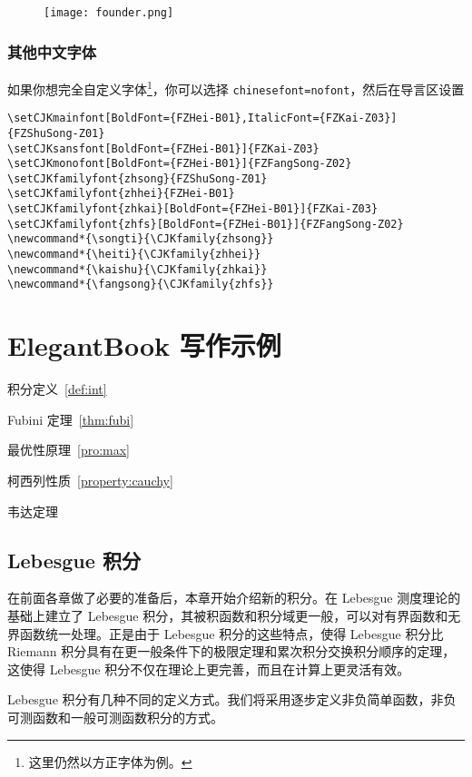 \documentclass[lang=cn,newtx,10pt,scheme=chinese,color=black]{elegantbook}
\begin{document}
\begin{figure}[!htb]
\centering
\texttt{[image: founder.png]}
\end{figure}

\subsection{其他中文字体}
如果你想完全自定义字体\footnote{这里仍然以方正字体为例。}，你可以选择 \lstinline{chinesefont=nofont}，然后在导言区设置
\begin{lstlisting}
\setCJKmainfont[BoldFont={FZHei-B01},ItalicFont={FZKai-Z03}]{FZShuSong-Z01}
\setCJKsansfont[BoldFont={FZHei-B01}]{FZKai-Z03}
\setCJKmonofont[BoldFont={FZHei-B01}]{FZFangSong-Z02}
\setCJKfamilyfont{zhsong}{FZShuSong-Z01}
\setCJKfamilyfont{zhhei}{FZHei-B01}
\setCJKfamilyfont{zhkai}[BoldFont={FZHei-B01}]{FZKai-Z03}
\setCJKfamilyfont{zhfs}[BoldFont={FZHei-B01}]{FZFangSong-Z02}
\newcommand*{\songti}{\CJKfamily{zhsong}}
\newcommand*{\heiti}{\CJKfamily{zhhei}}
\newcommand*{\kaishu}{\CJKfamily{zhkai}}
\newcommand*{\fangsong}{\CJKfamily{zhfs}}
\end{lstlisting}

\chapter{ElegantBook 写作示例}

\begin{introduction}
  \item 积分定义~\ref{def:int}
  \item Fubini 定理~\ref{thm:fubi}
  \item 最优性原理~\ref{pro:max}
  \item 柯西列性质~\ref{property:cauchy}
  \item 韦达定理
\end{introduction}

\section{Lebesgue 积分}
在前面各章做了必要的准备后，本章开始介绍新的积分。在 Lebesgue 测度理论的基础上建立了 Lebesgue 积分，其被积函数和积分域更一般，可以对有界函数和无界函数统一处理。正是由于 Lebesgue 积分的这些特点，使得 Lebesgue 积分比 Riemann 积分具有在更一般条件下的极限定理和累次积分交换积分顺序的定理，这使得 Lebesgue 积分不仅在理论上更完善，而且在计算上更灵活有效。

Lebesgue 积分有几种不同的定义方式。我们将采用逐步定义非负简单函数，非负可测函数和一般可测函数积分的方式。
\end{document}
